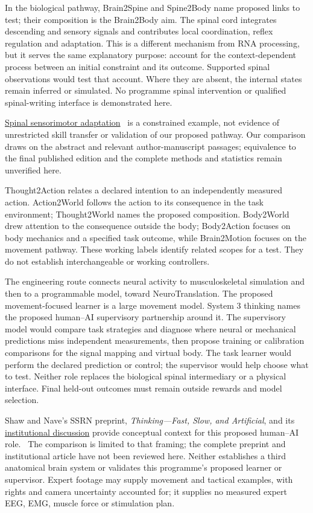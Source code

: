 In the biological pathway, Brain2Spine and Spine2Body name proposed links to
test; their composition is the Brain2Body aim. The spinal cord integrates
descending and sensory signals and contributes local coordination, reflex
regulation and adaptation. This is a different mechanism from RNA processing,
but it serves the same explanatory purpose: account for the context-dependent
process between an initial constraint and its outcome. Supported spinal
observations would test that account. Where they are absent, the internal
states remain inferred or simulated. No programme spinal intervention or qualified spinal-writing interface is demonstrated here.
\par\noindent \href{https://pubmed.ncbi.nlm.nih.gov/38603479/}{Spinal sensorimotor adaptation}~\cite{lavaud2024}
is a constrained example, not evidence of unrestricted skill transfer or
validation of our proposed pathway. Our comparison draws on the abstract and
relevant author-manuscript passages; equivalence to the final published edition
and the complete methods and statistics remain unverified here.

Thought2Action relates a declared intention to an independently measured action.
Action2World follows the action to its consequence in the task environment;
Thought2World names the proposed composition. Body2World drew attention to the
consequence outside the body; Body2Action focuses on body mechanics and a
specified task outcome, while Brain2Motion focuses on the movement pathway.
These working labels identify related scopes for a test. They do not establish
interchangeable or working controllers.

The engineering route connects neural activity to musculoskeletal simulation
and then to a programmable model, toward NeuroTranslation. The proposed
movement-focused learner is a large movement model. System 3 thinking names
the proposed human--AI supervisory partnership around it. The supervisory
model would compare task strategies and diagnose where neural or mechanical
predictions miss independent measurements, then propose training or calibration
comparisons for the signal mapping and virtual body. The task learner would
perform the declared prediction or control; the supervisor would help choose
what to test. Neither role replaces the biological spinal intermediary or a
physical interface. Final held-out outcomes must remain outside rewards and
model selection.
\par\noindent Shaw and Nave's SSRN preprint,
\emph{Thinking---Fast, Slow, and Artificial}, and its
\href{https://executiveeducation.wharton.upenn.edu/thought-leadership/wharton-at-work/2026/05/thinking-fast-slow-and-artificially/}{institutional discussion}
provide conceptual context for this proposed human--AI role.~\cite{shawNaveSystem3Retained}
The comparison is limited to that framing; the complete preprint and institutional
article have not been reviewed here. Neither establishes a third anatomical brain
system or validates this programme's proposed learner or supervisor. Expert footage may supply
movement and tactical examples, with rights and camera uncertainty accounted
for; it supplies no measured expert EEG, EMG, muscle force or stimulation plan.

